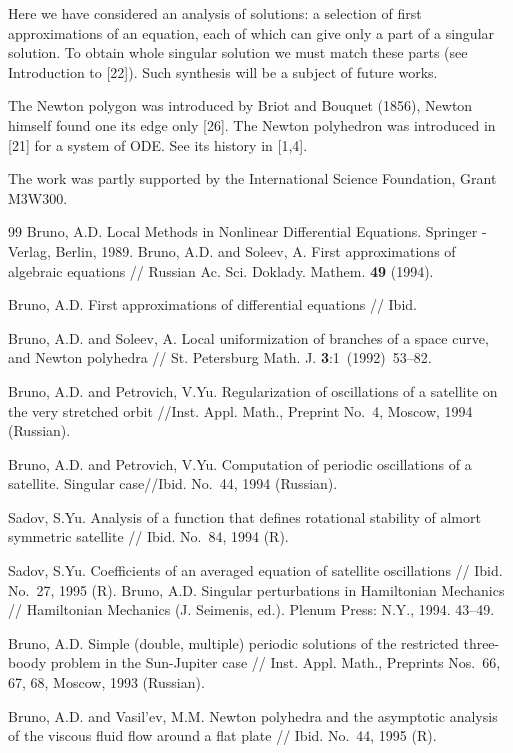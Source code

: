 Here we have considered an analysis of solutions: a selection of first
approximations of an equation, each of which can give only a part of a
singular solution. To obtain whole singular solution we must  match these
parts (see Introduction to  [22]). Such synthesis will be a subject of
future works.

The Newton polygon was introduced by Briot and Bouquet (1856), Newton himself
found one its edge only [26]. The Newton polyhedron was introduced in [21] for 
a
system of ODE. See its history in [1,4].

The  work was partly supported by the International Science Foundation, Grant
M3W300.

\begin{thebibliography}{99}
    Bruno, A.D. Local Methods in Nonlinear Differential Equations.
   Springer -Verlag, Berlin, 1989.
  Bruno, A.D. and  Soleev, A.  First approximations of algebraic equations //
  Russian Ac. Sci. Doklady. Mathem. {\bf 49} (1994).

  Bruno, A.D.   First approximations of differential equations //
  Ibid.

  Bruno, A.D. and  Soleev, A.  Local uniformization of branches of a space
curve, and Newton polyhedra // St. Petersburg Math. J. {\bf 3}:1~(1992)~53--82. 

  Bruno, A.D. and  Petrovich, V.Yu.  Regularization of oscillations of a
  satellite on the very stretched orbit //Inst. Appl. Math., Preprint No.~4,
  Moscow, 1994 (Russian).

  Bruno, A.D. and  Petrovich, V.Yu.  Computation of periodic oscillations of a
  satellite. Singular case//Ibid. No.~44, 1994 (Russian).

  Sadov, S.Yu. Analysis of a function that defines rotational stability of
  almort symmetric satellite // Ibid. No.~84, 1994 (R).

  Sadov, S.Yu. Coefficients of an averaged equation of satellite oscillations
  // Ibid. No.~27, 1995 (R).
  Bruno, A.D. Singular perturbations in Hamiltonian Mechanics // Hamiltonian
  Mechanics (J. Seimenis, ed.). Plenum Press: N.Y., 1994. 43--49.

  Bruno, A.D. Simple (double, multiple) periodic solutions of the restricted
  three-boody  problem in the Sun-Jupiter case //
  Inst. Appl. Math., Preprints Nos.~66, 67, 68,
  Moscow, 1993 (Russian).

  Bruno, A.D. and  Vasil'ev,  M.M. Newton polyhedra and the asymptotic
analysis of the viscous fluid flow around a flat plate // Ibid. No.~44, 1995 
(R).



\end{thebibliography}
